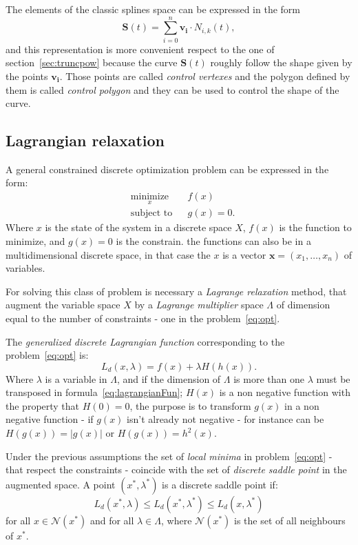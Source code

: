 \documentclass[a4paper]{article}
\begin{document}
The elements of the classic splines space can be expressed in the form
$$
\mathbf{S}(t)=\sum_{i=0}^n\mathbf{v_i}\cdot N_{i,k}(t),
$$
and this representation is more convenient respect to the one of
section~\ref{sec:truncpow} because the curve $\mathbf{S}(t)$ roughly
follow the shape given by the points $\mathbf{v_i}$. Those points are
called \emph{control vertexes} and the polygon defined by them is
called \emph{control polygon} and they can be used to control the
shape of the curve.

\subsection{Lagrangian relaxation}
A general constrained discrete optimization problem can be expressed in
the form:
\begin{equation}\label{eq:opt}
\begin{aligned}
& \underset{x}{\text{minimize}}
& & f(x) \\
& \text{subject to}
& & g(x)=0.
\end{aligned}
\end{equation}
Where $x$ is the state of the system in a discrete space $X$, $f(x)$
is the function to
minimize, and $g(x)=0$ is the constrain. the functions can also be
in a multidimensional discrete space, in that case the $x$ is a vector
$\mathbf{x}=(x_1,\dots,x_n)$ of variables.

For solving this class
of problem is necessary a \emph{Lagrange relaxation} method, that
augment the variable space $X$ by a \emph{Lagrange multiplier} space
$\Lambda$ of dimension equal to the number of constraints - one in the
problem~\eqref{eq:opt}.

The \emph{generalized discrete Lagrangian
  function} corresponding to the problem~\eqref{eq:opt} is:
\begin{equation}\label{eq:lagrangianFun}
  L_d(x,\lambda)=f(x)+\lambda H(h(x)).
\end{equation}
Where $\lambda$ is a variable in $\Lambda$, and if the dimension of
$\Lambda$ is more than one $\lambda$ must be transposed in
formula~\eqref{eq:lagrangianFun}; $H(x)$ is a non negative function
with the property that $H(0)=0$, the purpose is to transform $g(x)$ in
a non negative function - if $g(x)$ isn't already not negative - for
instance can be $H(g(x))=|g(x)|$ or $H(g(x))=h^2(x)$.

Under the previous assumptions the set of \emph{local minima}
in problem~\eqref{eq:opt} - that respect the constraints -  coincide
with the set of \emph{discrete saddle point}
in the augmented space. A point $(x^*,\lambda^*)$ is a discrete saddle
point if:
\begin{equation*}
  L_d(x^*,\lambda)\leq L_d(x^*,\lambda^*)\leq L_d(x,\lambda^*)
\end{equation*}
for all $x\in\mathcal{N}(x^*)$ and for all $\lambda\in\Lambda$, where
$\mathcal{N}(x^*)$ is the set of all neighbours of $x^*$.
\end{document}
